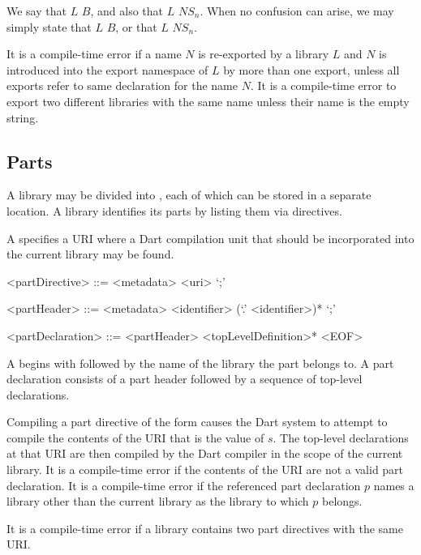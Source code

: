 \documentclass[makeidx]{article}
\begin{document}
{\LMHash{}%
We say that $L$  $B$, and also
that $L$  $NS_n$.
When no confusion can arise, we may simply state
that $L$  $B$, or
that $L$  $NS_n$.

\LMHash{}%
It is a compile-time error if a name $N$ is re-exported by a library $L$ and $N$ is introduced into the export namespace of $L$ by more than one export, unless all exports refer to same declaration for the name $N$.
It is a compile-time error to export two different libraries with the same name unless their name is the empty string.


\subsection{Parts}

\LMHash{}%
A library may be divided into , each of which can be stored in a separate location.
A library identifies its parts by listing them via \PART{} directives.

\LMHash{}%
A  specifies a URI where a Dart compilation unit that should be incorporated into the current library may be found.

\begin{grammar}
<partDirective> ::= <metadata> \PART{} <uri> `;'

<partHeader> ::= <metadata> \PART{} \OF{} <identifier> (`.' <identifier>)* `;'

<partDeclaration> ::= <partHeader> <topLevelDefinition>* <EOF>
\end{grammar}

\LMHash{}%
A  begins with \PART{} \OF{} followed by the name of the library the part belongs to.
A part declaration consists of a part header followed by a sequence of top-level declarations.

\LMHash{}%
Compiling a part directive of the form  causes the Dart system to attempt to compile the contents of the URI that is the value of $s$.
The top-level declarations at that URI are then compiled by the Dart compiler in the scope of the current library.
It is a compile-time error if the contents of the URI are not a valid part declaration.
It is a compile-time error if the referenced part declaration $p$ names a library other than the current library as the library to which $p$ belongs.

\LMHash{}%
It is a compile-time error if a library contains
two part directives with the same URI.

}
\end{document}
